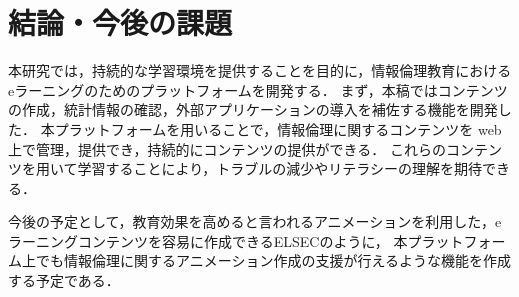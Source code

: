 \section{結論・今後の課題}\label{sec5}
本研究では，持続的な学習環境を提供することを目的に，情報倫理教育におけるeラーニングのためのプラットフォームを開発する．
まず，本稿ではコンテンツの作成，統計情報の確認，外部アプリケーションの導入を補佐する機能を開発した．
本プラットフォームを用いることで，情報倫理に関するコンテンツを web 上で管理，提供でき，持続的にコンテンツの提供ができる．
これらのコンテンツを用いて学習することにより，トラブルの減少やリテラシーの理解を期待できる．

今後の予定として，教育効果を高めると言われるアニメーションを利用した，eラーニングコンテンツを容易に作成できるELSEC\cite{elsec}のように，
本プラットフォーム上でも情報倫理に関するアニメーション作成の支援が行えるような機能を作成する予定である．
